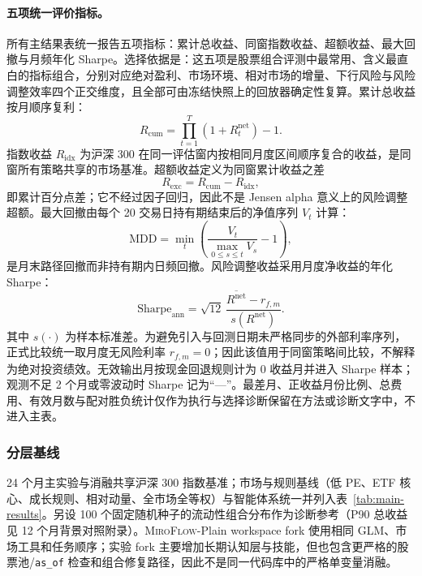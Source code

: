 \documentclass[11pt]{article}
\newcommand{\miroflow}{\textsc{MiroFlow}}
\begin{document}
\paragraph{五项统一评价指标。}
所有主结果表统一报告五项指标：累计总收益、同窗指数收益、超额收益、最大回撤与月频年化 Sharpe。选择依据是：这五项是股票组合评测中最常用、含义最直白的指标组合，分别对应绝对盈利、市场环境、相对市场的增量、下行风险与风险调整效率四个正交维度，且全部可由冻结快照上的回放器确定性复算。累计总收益按月顺序复利：
\begin{equation}
  R_{\mathrm{cum}}=\prod_{t=1}^{T}\left(1+R^{\mathrm{net}}_t\right)-1.
\end{equation}
指数收益 $R_{\mathrm{idx}}$ 为沪深 300 在同一评估窗内按相同月度区间顺序复合的收益，是同窗所有策略共享的市场基准。超额收益定义为同窗累计收益之差
\begin{equation}
  R_{\mathrm{exc}}=R_{\mathrm{cum}}-R_{\mathrm{idx}},
\end{equation}
即累计百分点差；它不经过因子回归，因此不是 Jensen alpha 意义上的风险调整超额。最大回撤由每个 20 交易日持有期结束后的净值序列 $V_t$ 计算：
\begin{equation}
  \mathrm{MDD}
  =\min_t\left(\frac{V_t}{\max_{0\leq s\leq t}V_s}-1\right),
\end{equation}
是月末路径回撤而非持有期内日频回撤。风险调整收益采用月度净收益的年化 Sharpe：
\begin{equation}
  \mathrm{Sharpe}_{\mathrm{ann}}
  =\sqrt{12}\,
  \frac{\overline{R^{\mathrm{net}}}-r_{f,m}}
       {s\!\left(R^{\mathrm{net}}\right)}.
\end{equation}
其中 $s(\cdot)$ 为样本标准差。为避免引入与回测日期未严格同步的外部利率序列，正式比较统一取月度无风险利率 $r_{f,m}=0$；因此该值用于同窗策略间比较，不解释为绝对投资绩效。无效输出月按现金回退规则计为 0 收益月并进入 Sharpe 样本；观测不足 2 个月或零波动时 Sharpe 记为``---''。最差月、正收益月份比例、总费用、有效月数与配对胜负统计仅作为执行与选择诊断保留在方法或诊断文字中，不进入主表。

\subsubsection{分层基线}
\label{sec:baselines}

24 个月主实验与消融共享沪深 300 指数基准；市场与规则基线（低 PE、ETF 核心、成长规则、相对动量、全市场全等权）与智能体系统一并列入表~\ref{tab:main-results}。另设 100 个固定随机种子的流动性组合分布作为诊断参考（P90 总收益见 12 个月背景对照附录）。\miroflow{}-Plain workspace fork 使用相同 GLM、市场工具和任务顺序；实验 fork 主要增加长期认知层与技能，但也包含更严格的股票池/\texttt{as\_of} 检查和组合修复路径，因此不是同一代码库中的严格单变量消融。
\end{document}
